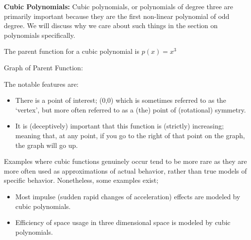 \documentclass{ximera}
\begin{document}
        \textbf{Cubic Polynomials:} Cubic polynomials, or polynomials of degree three are primarily important because they are the first non-linear polynomial of odd degree. We will discuss why we care about such things in the section on polynomials specifically.
        
        \begin{description}
            \item[Parent Function:] The parent function for a cubic polynomial is $p(x) = x^3$\\
            \begin{minipage}{\textwidth}\item[Graph of Parent Function:]\hspace*{0pt} \\
                \begin{center}
                \end{center}
            \end{minipage}
            
            \item[Notable Features of Graph:] The notable features are:
            \begin{itemize}
                \item There is a point of interest; (0,0) which is sometimes referred to as the `vertex', but more often referred to as a (the) point of (rotational) symmetry.
                \item It is (deceptively) important that this function is (strictly) increasing; meaning that, at any point, if you go to the right of that point on the graph, the graph will go up.
            \end{itemize}
            \item[Example usage:] Examples where cubic functions genuinely occur tend to be more rare as they are more often used as approximations of actual behavior, rather than true models of specific behavior. Nonetheless, some examples exist;
            
            \begin{itemize}
                \item Most impulse (sudden rapid changes of acceleration) effects are modeled by cubic polynomials.
                \item Efficiency of space usage in three dimensional space is modeled by cubic polynomials.
            \end{itemize}
        \end{description}
        
\end{document}

